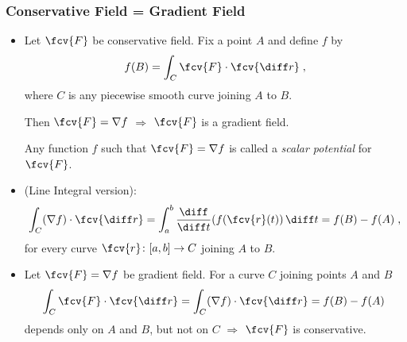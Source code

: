 \begin{frame}
\frametitle{Conservative Field = Gradient Field}
\begin{itemize}
\item Let $\fcv{F}$ be conservative field. Fix a point $A$ and define $f$ by
\[
f(B) = \int_C \fcv{F} \cdot \fcv{\diff r} \; ,
\]
where $C$ is any piecewise smooth curve joining $A$ to $B$.

\pause Then $\fcv{F} = \nabla f$ $\Longrightarrow$ $\fcv{F}$ is a gradient field.

Any function $f$ such that $\fcv{F}= \nabla f$ is called a \emph{scalar potential} for~$\fcv{F}$.

\item \pause
{} (Line Integral version):
%
\[
\int_C (\nabla f) \cdot \fcv{\diff r} = \int_a^b \frac{\diff }{\diff t} (f(\fcv{r}(t)) \, \diff t = f(B) - f(A) \; ,
\]
%
for every curve $\fcv{r} \colon [a,b] \to C$ joining $A$ to $B$.

 \item \pause Let $\fcv{F} = \nabla f$ be gradient field. \pause For a curve $C$ joining points $A$ and $B$
\[
\int_C \fcv{F} \cdot \fcv{\diff r} =  \int_C (\nabla f )\cdot \fcv{\diff r}= f(B) - f(A)\;
\]
\pause depends only on $A$ and $B$, but not on $C$ $\Rightarrow$ $\fcv{F}$ is conservative.
  \end{itemize}

\end{frame}